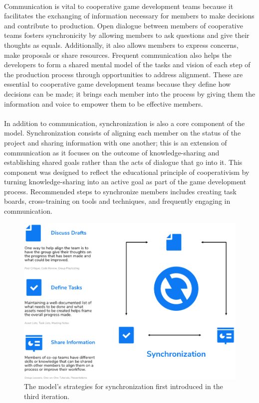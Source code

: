 \paragraph{} Communication is vital to cooperative game development teams because it facilitates the exchanging of information necessary for members to make decisions and contribute to production. Open dialogue between members of cooperative teams fosters synchronicity by allowing members to ask questions and give their thoughts as equals. Additionally, it also allows members to express concerns, make proposals or share resources. Frequent communication also helps the developers to form a shared mental model of the tasks and vision of each step of the production process through opportunities to address alignment. These are essential to cooperative game development teams because they define how decisions can be made; it brings each member into the process by giving them the information and voice to empower them to be effective members.

\paragraph{} In addition to communication, synchronization is also a core component of the model. Synchronization consists of aligning each member on the status of the project and sharing information with one another; this is an extension of communication as it focuses on the outcome of knowledge-sharing and establishing shared goals rather than the acts of dialogue that go into it. This component was designed to reflect the educational principle of cooperativism by turning knowledge-sharing into an active goal as part of the game development process. Recommended steps to synchronize members includes creating task boards, cross-training on tools and techniques, and frequently engaging in communication.

\begin{figure}[h!]
    \centering
    \includegraphics[width=\linewidth]{Figures/Sync.png}
    \caption{The model's strategies for synchronization first introduced in the third iteration.}
\end{figure}

